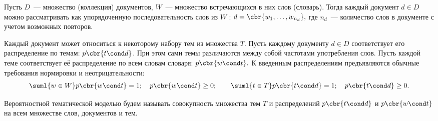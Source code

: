 Пусть  $D$~--- множество (коллекция) документов, $W$~--- множество встречающихся в них слов (словарь). Тогда каждый документ $d\in D$ можно рассматривать как упорядоченную последовательность слов из $W$ : $d = \cbr{w_1, \ldots, w_{n_d}},$ где $n_d$~--- количество слов в документе с учетом возможных повторов.

Каждый документ может относиться к некоторому набору тем из множества $T.$ Пусть каждому документу $d\in D$ соответствует его распределение по темам: $p\cbr{t\cond d}$. При этом сами темы различаются между собой частотами употребления слов. Пусть каждой теме соответствует её распределение по всем словам словаря: $p\cbr{w\cond t}.$ К введенным распределениям предъявляются обычные требования нормировки и неотрицательности:
$$\suml{w\in W}p\cbr{w\cond t} = 1; \quad p\cbr{w\cond t} \ge 0; 
\qquad
\suml{t\in T}p\cbr{t\cond d} = 1; \quad p\cbr{t\cond d} \ge 0.$$

Вероятностной тематической моделью будем называть совокупность множества тем $T$ и распределений $p\cbr{t\cond d}$ и $p\cbr{w\cond t}$ на всем множестве слов, документов и тем. 
